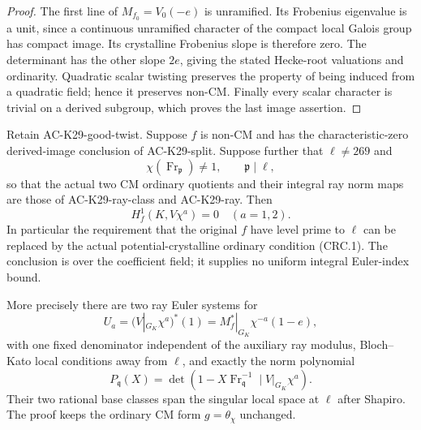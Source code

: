 \begin{proof}
The first line of $M_{f_0}=V_0(-e)$ is unramified.
Its Frobenius eigenvalue is a unit, since a continuous
unramified character of the compact local Galois group
has compact image.  Its crystalline Frobenius slope is
therefore zero.  The determinant has the other slope
$2e$, giving the stated Hecke-root valuations and
ordinarity.  Quadratic scalar twisting preserves the
property of being induced from a quadratic field;
hence it preserves non-CM.  Finally every scalar
character is trivial on a derived subgroup, which
proves the last image assertion.
\end{proof}

\begin{theorem}
\label{AC-K29-ramified}
Retain AC-K29-good-twist.  Suppose $f$ is non-CM and has
the characteristic-zero derived-image conclusion of
AC-K29-split.  Suppose further that $\ell\ne269$ and
\[
 \chi(\operatorname{Fr}_{\mathfrak p})\ne1,
 \qquad \mathfrak p\mid\ell,                              \tag{CRC.3}
\]
so that the actual two CM ordinary quotients and their
integral ray norm maps are those of AC-K29-ray-class
and AC-K29-ray.  Then
\[
                  H^1_f(K,V\chi^a)=0\quad(a=1,2).          \tag{CRC.4}
\]
In particular the requirement that the original $f$
have level prime to $\ell$ can be replaced by the
actual potential-crystalline ordinary condition
(CRC.1).  The conclusion is over the coefficient field;
it supplies no uniform integral Euler-index bound.

More precisely there are two ray Euler systems for
\[
 U_a=(V|_{G_K}\chi^a)^*(1)
       =M_f^*|_{G_K}\chi^{-a}(1-e),                       \tag{CRC.5}
\]
with one fixed denominator independent of the auxiliary
ray modulus, Bloch--Kato local conditions away from
$\ell$, and exactly the norm polynomial
\[
 P_{\mathfrak q}(X)=
       \det(1-X\operatorname{Fr}_{\mathfrak q}^{-1}
                    \mid V|_{G_K}\chi^a).                \tag{CRC.6}
\]
Their two rational base classes span the singular local
space at $\ell$ after Shapiro.  The proof keeps the
ordinary CM form $g=\theta_\chi$ unchanged.
\end{theorem}
